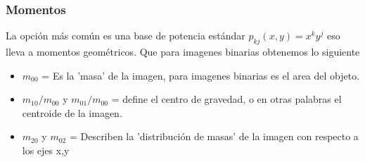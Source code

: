 \subsubsection{Momentos}
La opción más común es una base de potencia estándar \cite{Book:Jan2009} $p_{kj}(x,y) = x^k y^j$
eso lleva a momentos geométricos. Que para imagenes binarias obtenemos lo siguiente
\begin{itemize}
	\item $m_{00}$ =  Es la 'masa' de la imagen, para imagenes binarias es el area del objeto.
	\item $m_{10}/m_{00}$ y $m_{01}/m_{00}$ = define el centro de gravedad, o en otras palabras
	      el centroide de la imagen.
	\item $m_{20}$ y $m_{02}$ = Describen la 'distribución de masas' de la imagen con respecto a
	      los ejes x,y
\end{itemize}